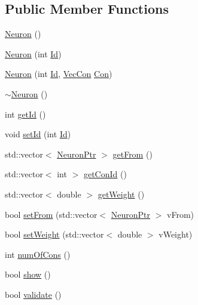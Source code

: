 \subsection*{Public Member Functions}
\begin{DoxyCompactItemize}
\item 
\hyperlink{class_neuron_a823487d01615fadb8ac19a2768dd9d96}{Neuron} ()
\item 
\hyperlink{class_neuron_a05698a11ac18b6cee34d18f63681ddcc}{Neuron} (int \hyperlink{class_neuron_a72bb327a7c5c865e6748a4e074ce0680}{Id})
\item 
\hyperlink{class_neuron_af6ba81347cc25d4d5d256dba2c4e441a}{Neuron} (int \hyperlink{class_neuron_a72bb327a7c5c865e6748a4e074ce0680}{Id}, \hyperlink{class_vec_con}{VecCon} \hyperlink{class_con}{Con})
\item 
\hyperlink{class_neuron_a94a250ce7e167760e593979b899745b1}{$\sim$Neuron} ()
\item 
int \hyperlink{class_neuron_ad9211d55ea50ad6dfbd2676b9e2335e4}{getId} ()
\item 
void \hyperlink{class_neuron_a6eb17a0d297b8c65170911aff37ba968}{setId} (int \hyperlink{class_neuron_a72bb327a7c5c865e6748a4e074ce0680}{Id})
\item 
std::vector$<$ \hyperlink{_a_m_o_r_e_8h_ac1ea936c2c7728eb382278131652fef4}{NeuronPtr} $>$ \hyperlink{class_neuron_a66e3800037d2789a8fe7b73996c14f84}{getFrom} ()
\item 
std::vector$<$ int $>$ \hyperlink{class_neuron_aac7d538b4a5087f730ba80f19852bced}{getConId} ()
\item 
std::vector$<$ double $>$ \hyperlink{class_neuron_a3349c0a2053e35afa5b7036bb816f8c6}{getWeight} ()
\item 
bool \hyperlink{class_neuron_ace0e92348f8a5604f25a3cfc07f38ec8}{setFrom} (std::vector$<$ \hyperlink{_a_m_o_r_e_8h_ac1ea936c2c7728eb382278131652fef4}{NeuronPtr} $>$ vFrom)
\item 
bool \hyperlink{class_neuron_ab067bfe507f5386eccc860d4ad2d0bca}{setWeight} (std::vector$<$ double $>$ vWeight)
\item 
int \hyperlink{class_neuron_ae447dce39ed04581609a83d742b585d1}{numOfCons} ()
\item 
bool \hyperlink{class_neuron_a255c3597520c730d798218f7174eff1b}{show} ()
\item 
bool \hyperlink{class_neuron_a95327aa80a9ec949491f214a0c159b5a}{validate} ()
\end{DoxyCompactItemize}
